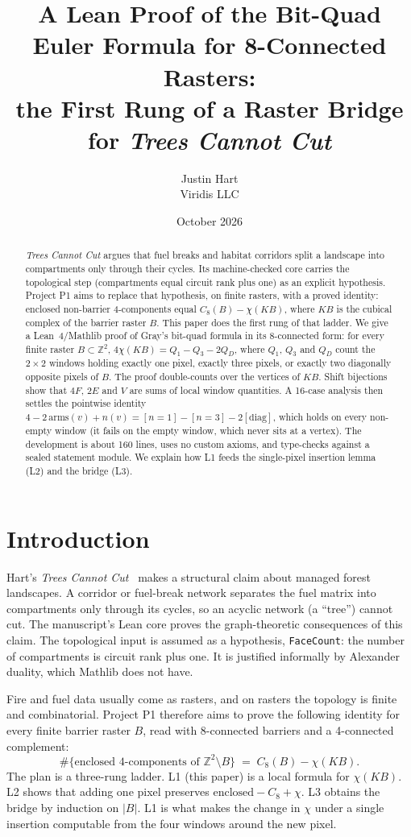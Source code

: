 \documentclass[11pt]{article}
\title{A Lean Proof of the Bit-Quad Euler Formula for 8-Connected Rasters:\\
the First Rung of a Raster Bridge for \emph{Trees Cannot Cut}}
\author{Justin Hart\\Viridis LLC}
\date{October 2026}
\theoremstyle{definition}
\theoremstyle{remark}
\begin{document}
\maketitle

\begin{abstract}
\emph{Trees Cannot Cut} argues that fuel breaks and habitat corridors split a
landscape into compartments only through their cycles. Its machine-checked core
carries the topological step (compartments equal circuit rank plus one) as an
explicit hypothesis. Project P1 aims to replace that hypothesis, on finite
rasters, with a proved identity: enclosed non-barrier 4-components equal
$C_8(B) - \chi(K B)$, where $K B$ is the cubical complex of the barrier raster
$B$. This paper does the first rung of that ladder. We give a Lean~4/Mathlib
proof of Gray's bit-quad formula in its 8-connected form: for every finite
raster $B \subset \mathbb{Z}^2$,
$4\chi(K B) = Q_1 - Q_3 - 2Q_D$, where $Q_1$, $Q_3$ and $Q_D$ count the
$2\times2$ windows holding exactly one pixel, exactly three pixels, or exactly
two diagonally opposite pixels of $B$. The proof double-counts over the vertices
of $K B$. Shift bijections show that $4F$, $2E$ and $V$ are sums of local window
quantities. A 16-case analysis then settles the pointwise identity
$4 - 2\,\mathrm{arms}(v) + n(v) = [n=1] - [n=3] - 2[\mathrm{diag}]$, which holds on
every non-empty window (it fails on the empty window, which never sits at a
vertex). The development is about 160 lines, uses no custom axioms, and
type-checks against a sealed statement module.
We explain how L1 feeds the single-pixel insertion lemma (L2) and the bridge (L3).
\end{abstract}

\section{Introduction}

Hart's \emph{Trees Cannot Cut}~\citep{Hart2026} makes a structural claim about
managed forest landscapes. A corridor or fuel-break network separates the fuel
matrix into compartments only through its cycles, so an acyclic network
(a ``tree'') cannot cut. The manuscript's Lean core proves the graph-theoretic
consequences of this claim. The topological input is assumed as a hypothesis,
\texttt{FaceCount}: the number of compartments is circuit rank plus one. It is
justified informally by Alexander duality, which Mathlib does not have.

Fire and fuel data usually come as rasters, and on rasters the topology is
finite and combinatorial. Project P1 therefore aims to prove the following
identity for every finite barrier raster $B$, read with 8-connected barriers
and a 4-connected complement:
\[
  \#\{\text{enclosed 4-components of } \mathbb{Z}^2\setminus B\}
  \;=\; C_8(B) - \chi(K B).
\]
The plan is a three-rung ladder. L1 (this paper) is a local formula for
$\chi(K B)$. L2 shows that adding one pixel preserves
$\text{enclosed} - C_8 + \chi$. L3 obtains the bridge by induction on $|B|$.
L1 is what makes the change in $\chi$ under a single insertion computable from
the four windows around the new pixel.
\end{document}
